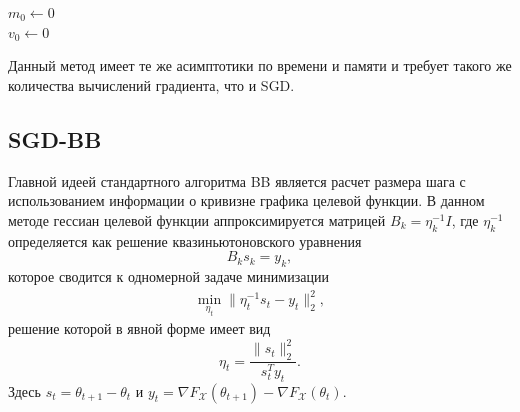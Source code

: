 \documentclass[preprint,12pt]{elsarticle}
\begin{document}
\begin{algorithm}[H]\label{Adam}
\caption {Adam все операции с векторами покомпонентные;\newline$\beta_i^{t+1}$ обозначает возведение числа $\beta_i$ в степень $t + 1$, $i \in \{1, 2\}$.}
\SetAlgoLined
\Input{Число итераций $N$ \newline
        Размер шага $\eta$ \newline
        Экспоненциальные скорости затухания $\beta_1, \beta_2 \in [0, 1)$ \newline
        Начальное приближение $\theta_0$ \newline
        Поправка на численную неустойчивость $\varepsilon$}
 $m_0 \leftarrow 0$\\
 $v_0 \leftarrow 0$\\
\end{algorithm}



Данный метод имеет те же асимптотики по времени и памяти и требует такого же количества вычислений градиента, что и SGD.

\subsection{SGD-BB}\label{SS:2.3}
Главной идеей стандартного алгоритма BB является расчет размера шага с использованием информации о кривизне графика целевой функции. 
В данном методе гессиан целевой функции аппроксимируется матрицей $B_k = \eta_k^{-1}I$, где $\eta_k^{-1}$ определяется как решение квазиньютоновского уравнения
\[
    B_ks_k = y_k,
\]
которое сводится к одномерной задаче минимизации
\begin{align*}
    \min_{\eta_{t}}\| \eta_t^{-1}s_{t}-y_{t}\|_2^2,
\end{align*}
решение которой в явной форме имеет вид
$$\eta_{t} = \frac{\|s_{t}\|_2^2}{s_{t}^Ty_{t}}.$$
Здесь $s_t = \theta_{t+1} - \theta_t$ и $y_t = \nabla F_\mathcal{X}(\theta_{t+1}) - \nabla F_\mathcal{X}(\theta_t)$.
\end{document}
